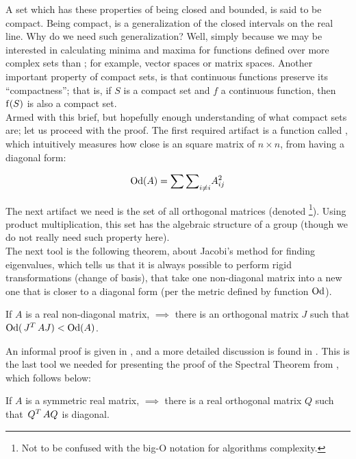 A set which has these properties of being closed and bounded, is said
to be compact. Being compact, is  a generalization of the closed intervals
on the real line. Why do we need such generalization? Well, simply
because we may be interested in calculating minima and maxima for
functions defined over more complex sets than \R{}; for example,
vector spaces or matrix spaces. Another important property of
compact sets, is that continuous functions preserve its
``compactness''; that is, if $S$ is a compact set and $f$ a continuous
function, then $\operatorname{f}(S)$ is also a compact set. \\

Armed with this brief, but hopefully enough understanding of what
compact sets are; let us proceed with the proof.
The first required artifact is a function called , which
intuitively measures how close is an square matrix of $n \times n$,
from having a diagonal form:

\[
\operatorname{Od}(A) = {\sum\sum}_{i \ne i} A_{ij}^2
\]
\hfill

The next artifact we need is the set of all orthogonal matrices
(denoted  \footnote{Not to be confused with the big-O
  notation for algorithms complexity.}). Using product multiplication, this set has the
algebraic structure of a group (though we do not really need such
property here). \\

The next tool is the following theorem, about Jacobi's method for
finding eigenvalues, which tells us that it is always possible to
perform rigid transformations (change of basis), that take one
non-diagonal matrix into a new one that is closer to a diagonal form
(per the metric defined by function $\operatorname{Od}$). \\

\begin{theorem}
\label{thm:jacobi}
If $A$ is a real non-diagonal matrix, $\implies$ there is an orthogonal
matrix $J$ such that $\operatorname{Od}(\,{J}^{T}\, A J) < \operatorname{Od}(A)$. 
\end{theorem}
\hfill

An informal proof is given in \cite{wilf81}, and a more detailed
discussion is found in \cite{golub13}. This is the last tool we needed
for presenting the proof of the Spectral Theorem from \cite{wilf81},
which follows below: \\

\begin{theorem}
\label{thm:spec}
If $A$ is a symmetric real matrix, $\implies$ there is a real orthogonal
matrix $Q$ such that $\,{Q}^{T}\,AQ$ is diagonal. 
\end{theorem}
\hfill

